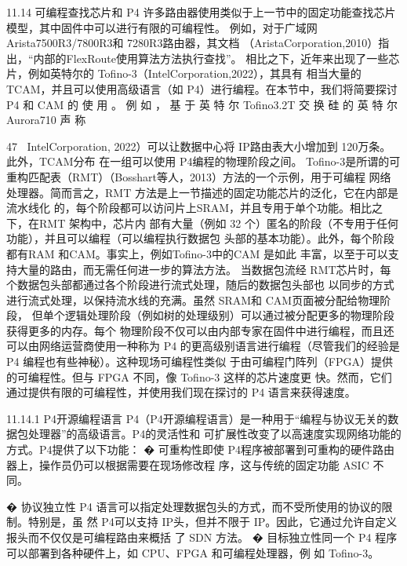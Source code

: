 11.14 可编程查找芯片和 P4
许多路由器使用类似于上一节中的固定功能查找芯片模型，其中固件中可以进行有限的可编程性。
例如，对于广域网 Arista7500R3/7800R3和 7280R3路由器，其文档
（AristaCorporation,2010）指出，“内部的FlexRoute使用算法方法执行查找”。
相比之下，近年来出现了一些芯片，例如英特尔的 Tofino-3（IntelCorporation,2022），其具有
相当大量的 TCAM，并且可以使用高级语言（如 P4）进行编程。在本节中，我们将简要探讨 P4
和 CAM 的 使 用 。 例 如 ， 基 于 英 特 尔 Tofino3.2T 交 换 硅 的 英 特 尔 Aurora710 声 称

                                                                  47
（IntelCorporation, 2022）可以让数据中心将 IP路由表大小增加到 120万条。此外，TCAM分布
在一组可以使用 P4编程的物理阶段之间。
Tofino-3是所谓的可重构匹配表（RMT）（Bosshart等人，2013）方法的一个示例，用于可编程
网络处理器。简而言之，RMT 方法是上一节描述的固定功能芯片的泛化，它在内部是流水线化
的，每个阶段都可以访问片上SRAM，并且专用于单个功能。相比之下，在RMT 架构中，芯片内
部有大量（例如 32 个）匿名的阶段（不专用于任何功能），并且可以编程（可以编程执行数据包
头部的基本功能）。此外，每个阶段都有RAM 和CAM。事实上，例如Tofino-3中的CAM 是如此
丰富，以至于可以支持大量的路由，而无需任何进一步的算法方法。
 当数据包流经 RMT芯片时，每个数据包头部都通过各个阶段进行流式处理，随后的数据包头部也
以同步的方式进行流式处理，以保持流水线的充满。虽然 SRAM和 CAM页面被分配给物理阶段，
但单个逻辑处理阶段（例如树的处理级别）可以通过被分配更多的物理阶段获得更多的内存。每个
        物理阶段不仅可以由内部专家在固件中进行编程，而且还可以由网络运营商使用一种称为
P4 的更高级别语言进行编程（尽管我们的经验是P4 编程也有些神秘）。这种现场可编程性类似
于由可编程门阵列（FPGA）提供的可编程性。但与 FPGA 不同，像 Tofino-3 这样的芯片速度更
快。然而，它们通过提供有限的可编程性，并使用我们现在探讨的 P4 语言来获得速度。

11.14.1 P4开源编程语言
P4（P4开源编程语言）是一种用于“编程与协议无关的数据包处理器”的高级语言。P4的灵活性和
可扩展性改变了以高速度实现网络功能的方式。P4提供了以下功能：
� 可重构性即使 P4程序被部署到可重构的硬件路由器上，操作员仍可以根据需要在现场修改程
序，这与传统的固定功能 ASIC 不同。



� 协议独立性 P4 语言可以指定处理数据包头的方式，而不受所使用的协议的限制。特别是，虽
然 P4可以支持 IP头，但并不限于 IP。因此，它通过允许自定义报头而不仅仅是可编程路由来概括
了 SDN 方法。
� 目标独立性同一个 P4 程序可以部署到各种硬件上，如 CPU、FPGA 和可编程处理器，例
如
Tofino-3。

